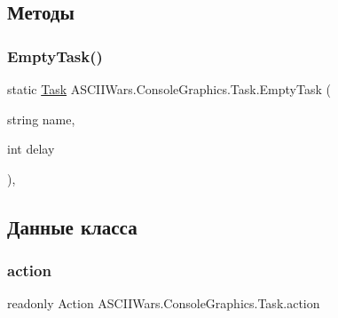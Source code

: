 \subsection{Методы}
\hypertarget{class_a_s_c_i_i_wars_1_1_console_graphics_1_1_task_a199974d73498b9de5c95c3e90864a59b}{}\label{class_a_s_c_i_i_wars_1_1_console_graphics_1_1_task_a199974d73498b9de5c95c3e90864a59b} 
\subsubsection{\texorpdfstring{Empty\+Task()}{EmptyTask()}}
{\footnotesize\ttfamily static \hyperlink{class_a_s_c_i_i_wars_1_1_console_graphics_1_1_task}{Task} A\+S\+C\+I\+I\+Wars.\+Console\+Graphics.\+Task.\+Empty\+Task (\begin{DoxyParamCaption}\item[{string}]{name,  }\item[{int}]{delay }\end{DoxyParamCaption})\hspace{0.3cm}{\ttfamily [inline]}, {\ttfamily [static]}}



\subsection{Данные класса}
\hypertarget{class_a_s_c_i_i_wars_1_1_console_graphics_1_1_task_a9fcf12d48e7ae10b20db0828cedf4f7d}{}\label{class_a_s_c_i_i_wars_1_1_console_graphics_1_1_task_a9fcf12d48e7ae10b20db0828cedf4f7d} 
\subsubsection{\texorpdfstring{action}{action}}
{\footnotesize\ttfamily readonly Action A\+S\+C\+I\+I\+Wars.\+Console\+Graphics.\+Task.\+action}

\hypertarget{class_a_s_c_i_i_wars_1_1_console_graphics_1_1_task_ad5fe90ee93b95cf0be9ec7d6d533dabc}{}\label{class_a_s_c_i_i_wars_1_1_console_graphics_1_1_task_ad5fe90ee93b95cf0be9ec7d6d533dabc} 
